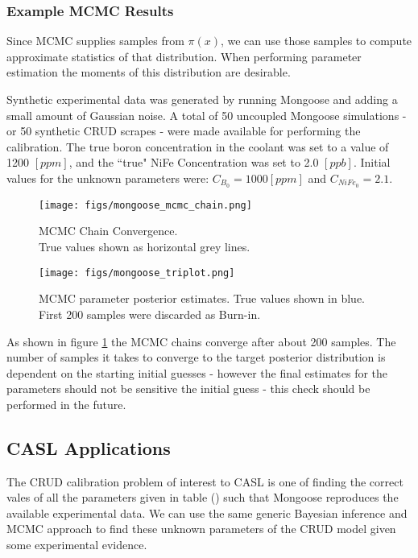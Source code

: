\documentclass[10pt,a4paper]{report}
\begin{document}
\subsubsection{Example MCMC Results}

Since MCMC supplies samples from $\pi(x)$, we can use those samples to compute approximate statistics of that distribution.  When performing parameter estimation the moments of this distribution are desirable.

Synthetic experimental data was generated by running Mongoose and adding a small amount of Gaussian noise.  A total of 50 uncoupled Mongoose simulations - or 50 synthetic CRUD scrapes - were made available for performing the calibration.  The true boron concentration in the coolant was set to a value of 1200 $[ppm]$, and the ``true" NiFe Concentration was set to 2.0 $[ppb]$. Initial values for the unknown parameters were: $C_{B_0} = 1000 [ppm]$ and $C_{NiFe_0} = 2.1$.

\begin{figure}
    \centering
    \begin{minipage}{.5\textwidth}
        \centering
        \texttt{[image: figs/mongoose\_mcmc\_chain.png]}
        \caption{MCMC Chain Convergence.  \\
            True values
        shown as horizontal grey lines. \label{fig:mg_chain}}
    \end{minipage}%
    \begin{minipage}{.5\textwidth}
        \centering
        \texttt{[image: figs/mongoose\_triplot.png]}
        \caption{MCMC parameter posterior estimates. True values shown in blue. First 200 samples were discarded as Burn-in.}
    \end{minipage}
\end{figure}

As shown in figure \ref{fig:mg_chain} the MCMC chains converge after about 200 samples.  The number of samples it takes to converge to the target posterior distribution is dependent on the starting initial guesses - however the final estimates for the parameters should not be sensitive the initial guess - this check should be performed in the future.

\subsection{CASL Applications}

The CRUD calibration problem of interest to CASL is one of finding the correct vales of all the parameters given in table () such that Mongoose reproduces the available experimental data.
We can use the same generic Bayesian inference and MCMC approach to find these unknown parameters of the CRUD model given some experimental evidence.
\end{document}
